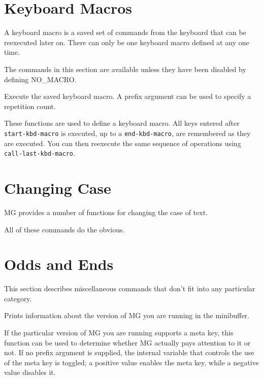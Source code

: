 \section{Keyboard Macros}

A keyboard macro is a saved set of commands from the keyboard that can be
reexecuted later on.  There can only be one keyboard macro defined at
any one time.

The commands in this section are available unless they have been disabled
by defining NO\_MACRO.

\fbody Execute the saved keyboard macro.  A prefix argument can be used
to specify a repetition count.

\fbody These functions are used to define a keyboard macro.  All keys
entered after {\tt start-kbd-macro} is executed, up to a {\tt end-kbd-macro},
are remembered as they are executed.  You can then reexecute the same
sequence of operations using {\tt call-last-kbd-macro}.


\section{Changing Case}

MG provides a number of functions for changing the case of text.

\fbody All of these commands do the obvious.


\section{Odds and Ends}

This section describes miscellaneous commands that don't fit into any
particular category.

\fbody Prints information about the version of MG you are running in
the minibuffer.

\fbody If the particular version of MG you are running supports a meta key,
this function can be used to determine whether MG actually pays attention
to it or not.  If no prefix argument is supplied, the internal variable
that controls the use of the meta key is toggled; a positive value enables
the meta key, while a negative value disables it.

